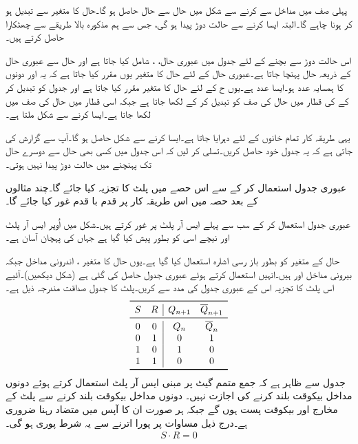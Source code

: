 پہلی صف میں مداخل  سے   کرنے سے شکل   میں حال   سے حال  حاصل   ہو گا۔حال کا متغیر   سے تبدیل ہو کر  ہونا چاہے گا۔البتہ ایسا کرنے سے حالت دوڑ پیدا ہو گی، جس سے ہم  مذکورہ بالا  طریقے سے چھٹکارا حاصل کرتے ہیں۔

اس  حالت دوڑ سے  بچنے کے لئے  جدول میں عبوری حال،  ، شامل کیا جاتا ہے  اور   حال   سے عبوری حال   کے ذریعہ حال    پہنچا جاتا ہے۔عبوری حال    کے  لئے حال کا متغیر یوں مقرر کیا جاتا ہے کہ یہ   اور     دونوں کا ہمسایہ عدد ہو۔ایسا عدد   ہے۔یوں ح   کے لئے حال  کا متغیر   مقرر کیا جاتا ہے اور جدول کو تبدیل کر کے   کی قطار   میں  حال  کی صف    کو تبدیل کر کے  لکھا جاتا ہے جبکہ اسی قطار میں حال  کی صف میں   لکھا جاتا ہے۔ایسا کرنے سے شکل     ملتا ہے۔

یہی طریقہ کار تمام خانوں کے لئے دہرایا جاتا ہے۔ایسا کرنے سے شکل   حاصل ہو گا۔آپ سے  گزارش کی جاتی ہے کہ   یہ جدول خود حاصل کریں۔تسلی کر لیں کہ اس جدول میں کسی بھی حال سے دوسرے حال تک پہنچنے میں حالت دوڑ پیدا نہیں ہوتی۔


عبوری جدول  استعمال  کر کے سے اس حصے  میں پلٹ کا تجزیہ کیا جائے گا۔چند مثالوں کے بعد حصہ  میں اس طریقہ کار پر قدم با قدم غور کیا  جائے گا۔

عبوری جدول استعمال  کر کے سب سے پہلے ایس آر پلٹ پر غور کرتے ہیں۔شکل   میں اُوپر  ایس آر پلٹ  اور نیچے اسی کو بطور  پیش کیا گیا ہے جہاں  کی پہچان آسان  ہے۔

 حال کے  متغیر   کو بطور باز رسی اشارہ   استعمال کیا گیا ہے۔یوں حال کا متغیر ، اندرونی مداخل   جبکہ بیرونی مداخل   اور  ہیں۔انہیں استعمال کرتے ہوئے عبوری جدول حاصل کی گئی ہے (شکل   دیکھیں)۔آئیے اس پلٹ کا تجزیہ اس کے عبوری جدول کی مدد سے کریں۔پلٹ کا جدول    صداقت مندرجہ ذیل ہے۔
 \begin{align*}
 \begin{array}{cc|cc}
 \toprule
 S&R&Q_{n+1}&\overline{Q}_{n+1}\\
 \midrule
 0&0&Q_n&\overline{Q}_n\\
 0&1&0&1\\
 1&0&1&0\\
 1&1&0&0\\
 \bottomrule
 \end{array}
\end{align*}
 جدول سے ظاہر ہے کہ  جمع   متمم گیٹ پر مبنی ایس آر پلٹ  استعمال کرتے ہوئے دونوں مداخل بیکوقت بلند کرنے کی اجازت نہیں۔ دونوں مداخل بیکوقت بلند کرنے   سے پلٹ کے مخارج   اور   بیکوقت پست ہوں گے جبکہ   ہر صورت  ان کا آپس میں متضاد رہنا ضروری ہے۔درج ذیل مساوات پر پورا اترنے سے یہ شرط پوری ہو گی۔
 \begin{align}
 S\cdot R=0
 \end{align}

